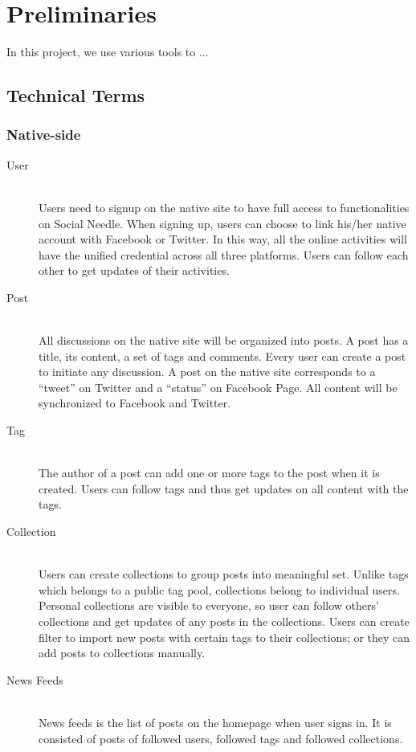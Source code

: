 
%
%

\chapter{Preliminaries}
In this project, we use various tools to ...
\section{Technical Terms}
\subsection{Native-side}
\begin{description}
	\item[User] \hfill \\
	Users need to signup on the native site to have full access to functionalities on Social Needle. When signing up, users can choose to link his/her native account with Facebook or Twitter. In this way, all the online activities will have the unified credential across all three platforms. 
	Users can follow each other to get updates of their activities. 
	\item[Post] \hfill \\
	All discussions on the native site will be organized into posts. A post has a title, its content, a set of tags and comments. Every user can create a post to initiate any discussion. A post on the native site corresponds to a ``tweet'' on Twitter and a ``status'' on Facebook Page. All content will be synchronized to Facebook and Twitter.
	\item[Tag] \hfill \\
	The author of a post can add one or more tags to the post when it is created. Users can follow tags and thus get updates on all content with the tags. 
	\item[Collection] \hfill \\
	Users can create collections to group posts into meaningful set. Unlike tags which belongs to a public tag pool, collections belong to individual users. Personal collections are visible to everyone, so user can follow others' collections and get updates of any posts in the collections. Users can create filter to import new posts with certain tags to their collections; or they can add posts to collections manually. 
	\item[News Feeds] \hfill \\
	News feeds is the list of posts on the homepage when user signs in. It is consisted of posts of followed users, followed tags and followed collections. 
\end{description}
